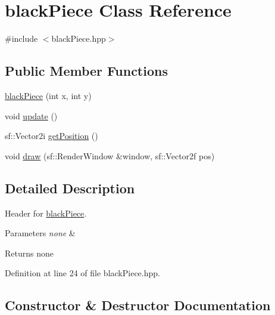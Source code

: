 \hypertarget{classblack_piece}{}\section{black\+Piece Class Reference}
\label{classblack_piece}


{\ttfamily \#include $<$black\+Piece.\+hpp$>$}

\subsection*{Public Member Functions}
\begin{DoxyCompactItemize}
\item 
\mbox{\hyperlink{classblack_piece_a79574283a1967fdfc782585aa3fb072b}{black\+Piece}} (int x, int y)
\item 
void \mbox{\hyperlink{classblack_piece_a8ab322b89affd828b413b3fee35827fa}{update}} ()
\item 
sf\+::\+Vector2i \mbox{\hyperlink{classblack_piece_aba875884346491615e27d4c5111b46a1}{get\+Position}} ()
\item 
void \mbox{\hyperlink{classblack_piece_ab73b4c4c5da2cd1571610deb79eaa9db}{draw}} (sf\+::\+Render\+Window \&window, sf\+::\+Vector2f pos)
\end{DoxyCompactItemize}


\subsection{Detailed Description}
Header for \mbox{\hyperlink{classblack_piece}{black\+Piece}}.


\begin{DoxyParams}{Parameters}
{\em none} & \\
\hline
\end{DoxyParams}
\begin{DoxyReturn}{Returns}
none 
\end{DoxyReturn}


Definition at line 24 of file black\+Piece.\+hpp.



\subsection{Constructor \& Destructor Documentation}
\mbox{\label{classblack_piece_a79574283a1967fdfc782585aa3fb072b}} 
